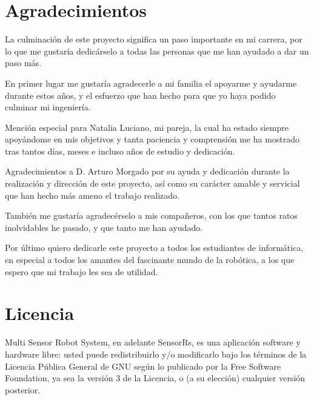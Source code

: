 

\section{Agradecimientos}
\label{sec:agradecimientos}

La culminación de este proyecto significa un paso importante en mi carrera, por lo que me gustaría dedicárselo a todas las personas que me han ayudado a dar un paso más.\bigskip

En primer lugar me gustaría agradecerle a mi familia el apoyarme y ayudarme durante estos años,
y el esfuerzo que han hecho para que yo haya podido culminar mi ingeniería.\bigskip

Mención especial para Natalia Luciano, mi pareja, la cual ha estado siempre apoyándome en mis objetivos y tanta paciencia y comprensión me ha mostrado tras tantos días, meses e incluso años de estudio 
y dedicación.\bigskip

Agradecimientos a D. Arturo Morgado por su ayuda y dedicación durante la realización y dirección de este proyecto, así como su carácter amable y servicial que han hecho más ameno el trabajo realizado.\bigskip

También me gustaría agradecérselo a mis compañeros, con los que tantos ratos inolvidables he pasado, y que tanto me han ayudado.\bigskip

Por último quiero dedicarle este proyecto a todos los estudiantes de informática, en especial a todos los amantes del fascinante mundo de la robótica, a los que espero que mi trabajo les sea de utilidad.

\cleardoublepage

\section{Licencia}
\label{sec:licencia}

\bigskip
\bigskip

Multi Sensor Robot System, en adelante SensorRs, es una aplicación software y hardware libre: usted puede redistribuirlo y/o modificarlo bajo los términos de la Licencia Pública General de GNU según lo publicado por la Free Software Foundation, ya sea la versión 3 
de la Licencia, o (a su elección) cualquier versión posterior.\\

